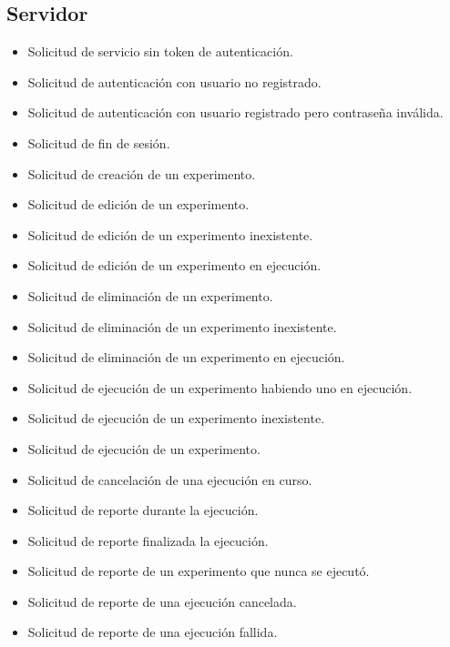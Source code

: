 \subsection{Servidor}
\begin{itemize}
\item Solicitud de servicio sin token de autenticaci\'on.
\item Solicitud de autenticaci\'on con usuario no registrado.
\item Solicitud de autenticaci\'on con usuario registrado pero contrase\~na inv\'alida.
\item Solicitud de fin de sesi\'on.
\item Solicitud de creaci\'on de un experimento.
\item Solicitud de edici\'on de un experimento.
\item Solicitud de edici\'on de un experimento inexistente.
\item Solicitud de edici\'on de un experimento en ejecuci\'on.
\item Solicitud de eliminaci\'on de un experimento.
\item Solicitud de eliminaci\'on de un experimento inexistente.
\item Solicitud de eliminaci\'on de un experimento en ejecuci\'on.
\item Solicitud de ejecuci\'on de un experimento habiendo uno en ejecuci\'on.
\item Solicitud de ejecuci\'on de un experimento inexistente.
\item Solicitud de ejecuci\'on de un experimento.
\item Solicitud de cancelaci\'on de una ejecuci\'on en curso.
\item Solicitud de reporte durante la ejecuci\'on.
\item Solicitud de reporte finalizada la ejecuci\'on.
\item Solicitud de reporte de un experimento que nunca se ejecut\'o.
\item Solicitud de reporte de una ejecuci\'on cancelada.
\item Solicitud de reporte de una ejecuci\'on fallida.
\end{itemize}

